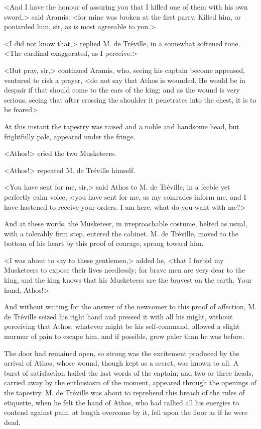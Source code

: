 <And I have the honour of assuring you that I killed one of them with his own sword,> said Aramis; <for mine was broken at the first parry. Killed him, or poniarded him, sir, as is most agreeable to you.> 

<I did not know that,> replied M. de Tréville, in a somewhat softened tone. <The cardinal exaggerated, as I perceive.> 

<But pray, sir,> continued Aramis, who, seeing his captain become appeased, ventured to risk a prayer, <do not say that Athos is wounded. He would be in despair if that should come to the ears of the king; and as the wound is very serious, seeing that after crossing the shoulder it penetrates into the chest, it is to be feared\longdash> 

At this instant the tapestry was raised and a noble and handsome head, but frightfully pale, appeared under the fringe. 

<Athos!> cried the two Musketeers. 

<Athos!> repeated M. de Tréville himself. 

<You have sent for me, sir,> said Athos to M. de Tréville, in a feeble yet perfectly calm voice, <you have sent for me, as my comrades inform me, and I have hastened to receive your orders. I am here; what do you want with me?> 

And at these words, the Musketeer, in irreproachable costume, belted as usual, with a tolerably firm step, entered the cabinet. M. de Tréville, moved to the bottom of his heart by this proof of courage, sprang toward him. 

<I was about to say to these gentlemen,> added he, <that I forbid my Musketeers to expose their lives needlessly; for brave men are very dear to the king, and the king knows that his Musketeers are the bravest on the earth. Your hand, Athos!> 

And without waiting for the answer of the newcomer to this proof of affection, M. de Tréville seized his right hand and pressed it with all his might, without perceiving that Athos, whatever might be his self-command, allowed a slight murmur of pain to escape him, and if possible, grew paler than he was before. 

The door had remained open, so strong was the excitement produced by the arrival of Athos, whose wound, though kept as a secret, was known to all. A burst of satisfaction hailed the last words of the captain; and two or three heads, carried away by the enthusiasm of the moment, appeared through the openings of the tapestry. M. de Tréville was about to reprehend this breach of the rules of etiquette, when he felt the hand of Athos, who had rallied all his energies to contend against pain, at length overcome by it, fell upon the floor as if he were dead. 

